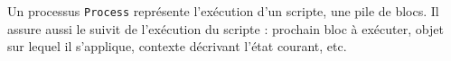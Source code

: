 % 
% 
% 
% 
% 

Un processus \texttt{Process} représente l'exécution d'un scripte, une pile de blocs. Il assure aussi le suivit de l'exécution du scripte : prochain bloc à exécuter, objet sur lequel il s'applique, contexte décrivant l'état courant, etc.


